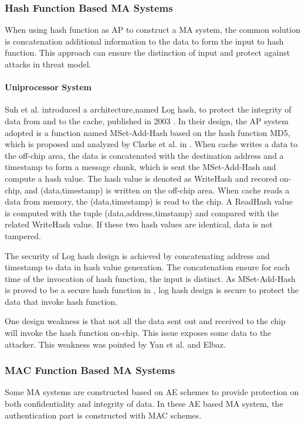 \documentclass{article}
\begin{document}
\subsubsection{Hash Function Based MA Systems}
When using hash function as AP to construct a MA system, the common solution is concatenation additional information to the data to form the input to hash function. This approach can ensure the distinction of input and protect against attacks in threat model.
\paragraph{Uniprocessor System}
Suh et al. introduced a architecture,named Log hash, to protect the integrity of data from and to the cache, published in 2003 \cite{Suh-MA}.
In their design, the AP system adopted is a function named MSet-Add-Hash based on the hash function MD5, which is proposed and analyzed by Clarke et al. in \cite{Clarke-hash}. When cache writes a data to the off-chip area, the data is concatenated with the destination address and a timestamp to form a message chunk, which is sent the  MSet-Add-Hash and compute a hash value. The hash value is denoted as WriteHash and recored on-chip, and (data,timestamp) is written on the off-chip area.
When cache reads a data from memory, the (data,timestamp) is read to the chip. A ReadHash value is computed with the tuple (data,address,timstamp) and compared with the related WriteHash value. If these two hash values are identical, data is not tampered.

The security of Log hash design is achieved by concatenating address and timestamp to data in hash value generation. The concatenation ensure for each time of the invocation of hash function, the input is distinct.
As MSet-Add-Hash is proved to be a secure hash function in \cite{Clarke-hash}, log hash design is secure to protect the data that invoke hash function.

One design weakness is that not all the data sent out and received to the chip will invoke the hash function on-chip. This issue exposes some data to the attacker. This weakness was pointed by Yan et al.\cite{yan-MA} and Elbaz\cite{area}. 

\subsubsection{MAC Function Based MA Systems}
Some MA systems are constructed based on AE schemes to provide protection on both confidentiality and integrity of data. In these AE based MA system, the authentication part is constructed with MAC schemes.
\end{document}
